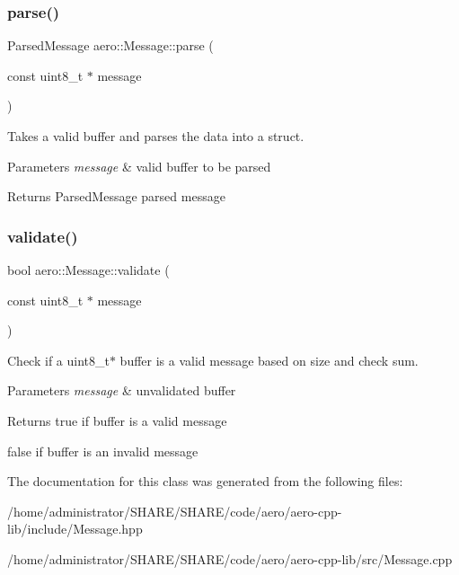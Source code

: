 \subsubsection{\texorpdfstring{parse()}{parse()}}
{\footnotesize\ttfamily Parsed\+Message aero\+::\+Message\+::parse (\begin{DoxyParamCaption}\item[{const uint8\+\_\+t $\ast$}]{message }\end{DoxyParamCaption})}



Takes a valid buffer and parses the data into a struct. 


\begin{DoxyParams}{Parameters}
{\em message} & valid buffer to be parsed \\
\hline
\end{DoxyParams}
\begin{DoxyReturn}{Returns}
Parsed\+Message parsed message 
\end{DoxyReturn}
\mbox{\label{classaero_1_1Message_a2fcf820b38d5fb5a01db7c3ff0f23d98}} 
\subsubsection{\texorpdfstring{validate()}{validate()}}
{\footnotesize\ttfamily bool aero\+::\+Message\+::validate (\begin{DoxyParamCaption}\item[{const uint8\+\_\+t $\ast$}]{message }\end{DoxyParamCaption})}



Check if a uint8\+\_\+t$\ast$ buffer is a valid message based on size and check sum. 


\begin{DoxyParams}{Parameters}
{\em message} & unvalidated buffer \\
\hline
\end{DoxyParams}
\begin{DoxyReturn}{Returns}
true if buffer is a valid message 

false if buffer is an invalid message 
\end{DoxyReturn}


The documentation for this class was generated from the following files\+:\begin{DoxyCompactItemize}
\item 
/home/administrator/\+S\+H\+A\+R\+E/\+S\+H\+A\+R\+E/code/aero/aero-\/cpp-\/lib/include/Message.\+hpp\item 
/home/administrator/\+S\+H\+A\+R\+E/\+S\+H\+A\+R\+E/code/aero/aero-\/cpp-\/lib/src/Message.\+cpp\end{DoxyCompactItemize}

